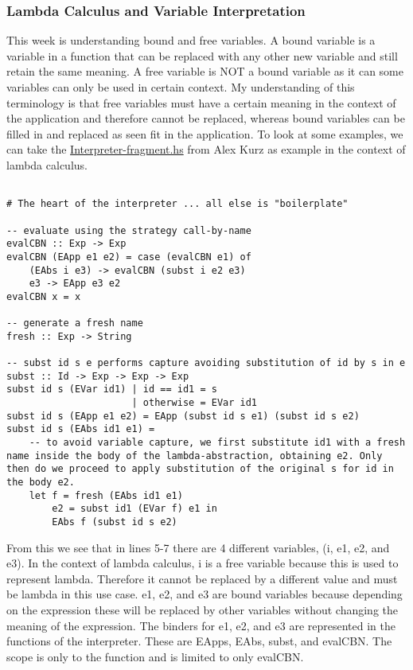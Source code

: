 \documentclass{article}
\theoremstyle{theorem}
\theoremstyle{definition}
\theoremstyle{remark}
\begin{document}
\subsubsection{Lambda Calculus and Variable Interpretation}
This week is understanding bound and free variables. A bound variable is a variable in a function that can be replaced with any other new variable and still retain the same meaning. A free variable is NOT a bound variable as it can some variables can only be used in certain context. My understanding of this terminology is that free variables must have a certain meaning in the context of the application and therefore cannot be replaced, whereas bound variables can be filled in and replaced as seen fit in the application. To look at some examples, we can take the \href{https://github.com/alexhkurz/programming-languages-2022/blob/main/src/LambdaNat0/src/Interpreter-fragment.hs}{Interpreter-fragment.hs} from Alex Kurz as example in the context of lambda calculus.
\begin{lstlisting}

# The heart of the interpreter ... all else is "boilerplate"

-- evaluate using the strategy call-by-name
evalCBN :: Exp -> Exp  
evalCBN (EApp e1 e2) = case (evalCBN e1) of
    (EAbs i e3) -> evalCBN (subst i e2 e3)
    e3 -> EApp e3 e2
evalCBN x = x 

-- generate a fresh name
fresh :: Exp -> String

-- subst id s e performs capture avoiding substitution of id by s in e
subst :: Id -> Exp -> Exp -> Exp
subst id s (EVar id1) | id == id1 = s
                      | otherwise = EVar id1
subst id s (EApp e1 e2) = EApp (subst id s e1) (subst id s e2)
subst id s (EAbs id1 e1) = 
    -- to avoid variable capture, we first substitute id1 with a fresh name inside the body of the lambda-abstraction, obtaining e2. Only then do we proceed to apply substitution of the original s for id in the body e2.
    let f = fresh (EAbs id1 e1)
        e2 = subst id1 (EVar f) e1 in 
        EAbs f (subst id s e2)
\end{lstlisting}

From this we see that in lines 5-7 there are 4 different variables, (i, e1, e2, and e3). In the context of lambda calculus, i is a free variable because this is used to represent lambda. Therefore it cannot be replaced by a different value and must be lambda in this use case. e1, e2, and e3 are bound variables because depending on the expression these will be replaced by other variables without changing the meaning of the expression. The binders for e1, e2, and e3 are represented in the functions of the interpreter. These are EApps, EAbs, subst, and evalCBN. The scope is only to the function and is limited to only evalCBN.
\end{document}
